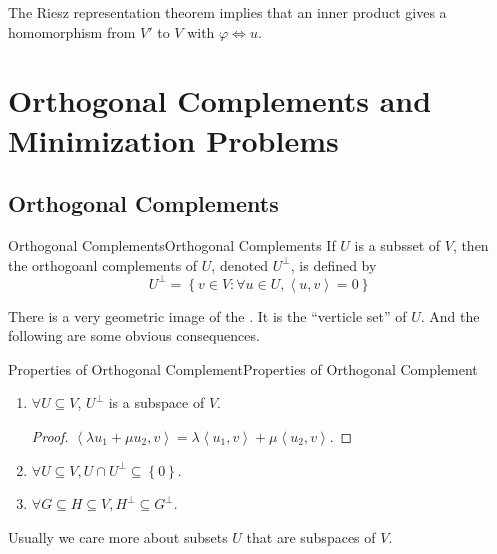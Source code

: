 \documentclass[../main.tex]{subfiles}
\begin{document}
\begin{remark}
The Riesz representation theorem implies that an inner product gives a homomorphism from $V'$ to $V$ with $\varphi \Leftrightarrow u$.
\end{remark}


\section{Orthogonal Complements and Minimization Problems}
\subsection{Orthogonal Complements}
\begin{definition}{Orthogonal Complements}{Orthogonal Complements}
If $U$ is a subsset of $V$, then the orthogoanl complements of $U$, denoted $U^{\perp }$, is defined by
\begin{equation}
U^{\perp} = \left\{ v\in V : \forall u\in U,\left<u,v\right> = 0\right\}
\end{equation}
\end{definition}

There is a very geometric image of the . It is the ``verticle set'' of $U$. And the following are some obvious consequences.

\begin{proposition}{Properties of Orthogonal Complement}{Properties of Orthogonal Complement}
\begin{enumerate}
\item $\forall U \subseteq V$, $U^{\perp}$ is a subspace of $V$.
\begin{proof}
$\left<\lambda u_1+\mu u_2,v\right>  = \lambda \left<u_1,v\right> + \mu \left<u_2, v\right> $.
\end{proof}
\item $\forall U \subseteq V, U \cap U^{\perp} \subseteq \left\{ 0 \right\}$.
\item $\forall G \subseteq H \subseteq V, H^{\perp} \subseteq G^{\perp}$.
\end{enumerate}
\end{proposition}

Usually we care more about subsets $U$ that are subspaces of $V$.
\end{document}
